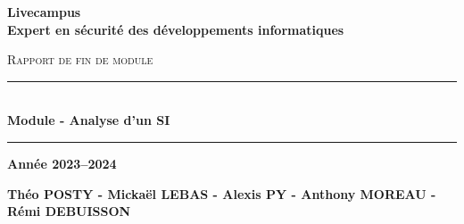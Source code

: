 \begin{titlepage}
    \begin{center}
       \vfill
       \begin{minipage}[c]{0.45\textwidth}
           \centering
       \end{minipage}
       \hfill
       \begin{minipage}[c]{0.45\textwidth}
       \end{minipage}
       \vfill
       \vspace{1.5cm}

       \textbf{\LARGE Livecampus}\\[0.3cm]
       \textbf{\Large Expert en sécurité des développements informatiques}

       \vspace{2cm}

       \textsc{\huge Rapport de fin de module}\\[1.2cm]

       \begin{center}
           \rule{\textwidth}{0.4mm}\\[0.4cm]
           \textbf{\Huge Module - Analyse d'un SI}
           \rule{\textwidth}{0.4mm}
       \end{center}

       \vspace{0.1cm}

       \textbf{\large Année 2023--2024}

       \vspace{1.6cm}

       \textbf{\Large Théo POSTY - Mickaël LEBAS - Alexis PY - Anthony MOREAU - Rémi DEBUISSON}


       \vspace{2.2cm}
       \vfill
    \end{center}
\end{titlepage}
